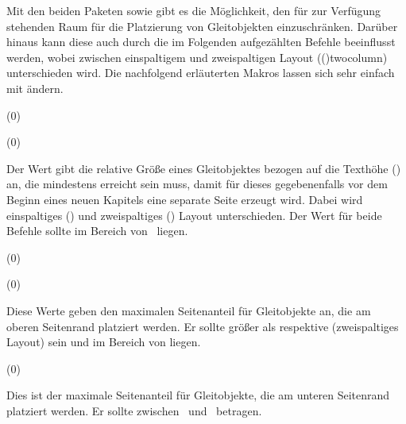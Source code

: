 \begin{Entity}{}
Mit den beiden Paketen  sowie  gibt es die 
Möglichkeit, den für  zur Verfügung stehenden Raum für die 
Platzierung von Gleitobjekten einzuschränken. Darüber hinaus kann diese auch 
durch die im Folgenden aufgezählten Befehle beeinflusst werden, wobei zwischen 
einspaltigem und zweispaltigen Layout (\Option(){twocolumn}) 
unterschieden wird. Die nachfolgend erläuterten Makros lassen sich sehr 
einfach mit  ändern.

\begin{Declaration}
  {}
  (0\floatpagefraction)
\begin{Declaration}
  {}
  (0\dblfloatpagefraction)
\printdeclarationlist

Der Wert gibt die relative Größe eines Gleitobjektes bezogen auf die Texthöhe 
() an, die mindestens erreicht sein muss, damit für dieses 
gegebenenfalls vor dem Beginn eines neuen Kapitels eine separate Seite erzeugt 
wird. Dabei wird einspaltiges () und zweispaltiges 
() Layout unterschieden. Der Wert für beide 
Befehle sollte im Bereich von~ liegen.
\end{Declaration}
\end{Declaration}

\begin{Declaration}
  {}
  (0\topfraction)
\begin{Declaration}
  {}
  (0\dbltopfraction)
\printdeclarationlist

Diese Werte geben den maximalen Seitenanteil für Gleitobjekte an, die am oberen 
Seitenrand platziert werden. Er sollte größer als  
respektive  (zweispaltiges Layout) sein und im 
Bereich von  liegen. 
\end{Declaration}
\end{Declaration}

\begin{Declaration}
  {}
  (0\bottomfraction)
\printdeclarationlist

Dies ist der maximale Seitenanteil für Gleitobjekte, die am unteren Seitenrand 
platziert werden. Er sollte zwischen~ und~ betragen.
\end{Declaration}


\end{Entity}
